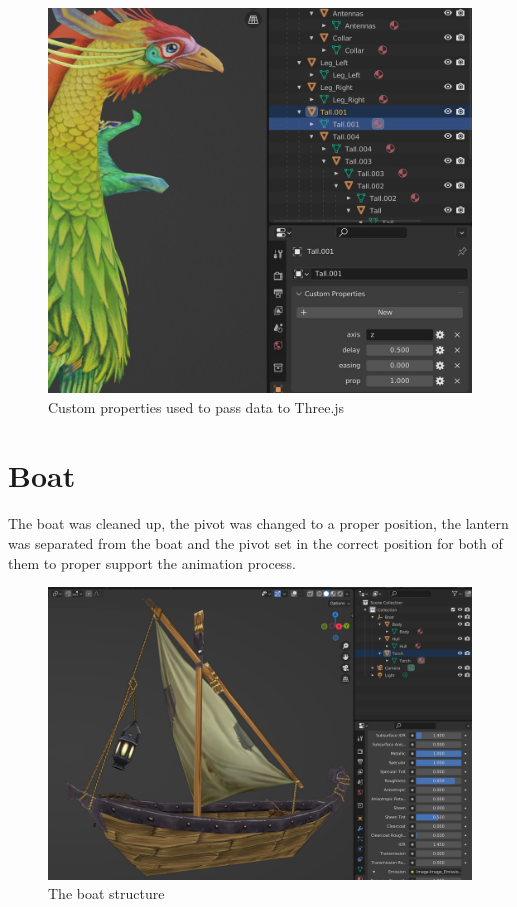 \documentclass[10pt,a4paper]{article}
\begin{document}
\begin{figure}[H]
\caption{Custom properties used to pass data to Three.js}
\includegraphics[width=1\textwidth]{phoenix_data}
\end{figure}

\section{Boat}

The boat was cleaned up, the pivot was changed to a proper position, the lantern was separated from the boat and the pivot set in the correct position for both of them to proper support the animation process.

\begin{center}
\begin{figure}[H]
\caption{The boat structure}
\includegraphics[width=1\textwidth]{boat}
\end{figure}
\end{center}
\end{document}
